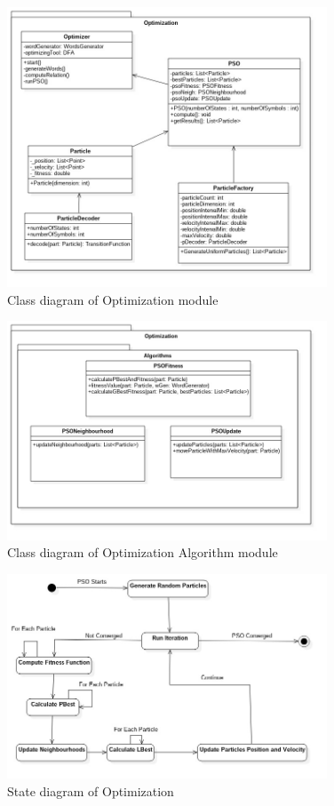 \documentclass[runningheads, a4paper]{llncs}
\begin{document}
\begin{figure}[h]
\label{fig:class_opt_main}
\caption{Class diagram of Optimization module }
    \includegraphics[width=0.85\textwidth]{res/uml/classes/optimizationMain.jpg}
\end{figure}


\begin{figure}[h]
\label{fig:class_opt_alg}
\caption{Class diagram of Optimization Algorithm module}
    \includegraphics[width=0.85\textwidth]{res/uml/classes/optimizationAlg.jpg}
\end{figure}

\begin{figure}[h]
\label{fig:state_opt}
\caption{State diagram of Optimization}
    \includegraphics[width=0.85\textwidth]{res/uml/states/optimizer.jpg}
\end{figure}
\end{document}
